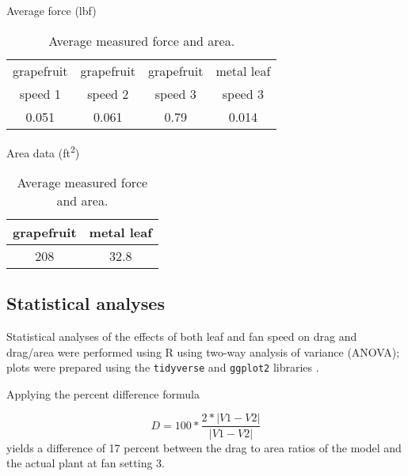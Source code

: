 \begin{table}

\caption{Average measured force and area.}

\label{tbl:results1}
\begin{center}
Average force (\si{lbf})\\
\begin{tabular}{cccc}
\toprule
grapefruit & grapefruit & grapefruit & metal leaf \\
speed 1 & speed 2 & speed 3 & speed 3 \\
\midrule
0.051 & 0.061 & 0.79 & 0.014\\
\bottomrule
\end{tabular}
\end{center}
\begin{center}
Area data (\si{ft\squared})\\
\begin{tabular}{cc}
\toprule
grapefruit & metal leaf \\
\midrule
208 & 32.8 \\
\bottomrule
\end{tabular}
\end{center}
\end{table}

\subsection{Statistical analyses}
Statistical analyses of the effects of both leaf and fan speed on drag and drag/area were performed using R \citep{r2020} using two-way analysis of variance (ANOVA); plots were prepared using the \lstinline{tidyverse} and \lstinline{ggplot2} libraries \citep{wickham2019tidyverse}.

Applying the percent difference formula

\[D=100*\frac{2*|V1-V2|}{|V1-V2|}\]
yields a difference of 17 percent between the drag to area ratios of the model and the actual plant at fan setting 3. 








